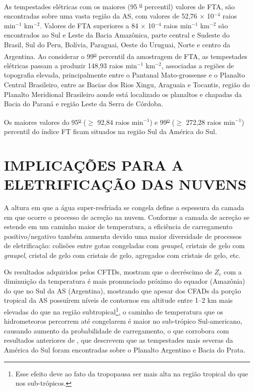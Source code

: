 As tempestades elétricas com os maiores (95 \textsuperscript{\underline{o}} percentil) valores de FTA, são encontradas sobre uma vasta região da AS, com valores de 52,76 $\times$ 10$^{-4}$ raios min$^{-1}$ km$^{-2}$. Valores de FTA superiores a 84 $\times$ 10$^{-4}$ raios min$^{-1}$ km$^{-2}$ são encontrados ao Sul e Leste da Bacia Amazônica, parte central e Sudeste do Brasil, Sul do Peru, Bolívia, Paraguai, Oeste do Uruguai, Norte e centro da Argentina. Ao considerar o 99\textsuperscript{\underline{o}} percentil da amostragem de FTA, as tempestades elétricas passam a produzir 148,93 raios min$^{-1}$ km$^{-2}$, associadas a regiões de topografia elevada, principalmente entre o Pantanal Mato-grossense e o Planalto Central Brasileiro, entre as Bacias dos Rios Xingu, Araguaia e Tocantis, região do Planalto Meridional Brasileiro aonde está localizado os planaltos e chapadas da Bacia do Paraná e região Leste da Serra de Córdoba.


Os maiores valores do 95\textsuperscript{\underline{o}} ($\geq$ 92,84 raios min$^{-1}$) e 99\textsuperscript{\underline{o}} ($\geq$ 272,28 raios min$^{-1}$) percentil do índice FT ficam situados na região Sul da América do Sul.




\section{IMPLICAÇÕES PARA A ELETRIFICAÇÃO DAS NUVENS}


A altura em que a água super-resfriada se congela define a espessura da camada em que ocorre o processo de  acreção na nuvem. Conforme a camada de acreção se estende em um caminho maior de temperatura, a eficiência de carregamento positivo/negativo também aumenta devido uma maior diversidade de processos de eletrificação: colisões entre gotas congeladas com \textit{graupel}, cristais de gelo com \textit{graupel}, cristal de gelo com cristais de gelo, agregados com cristais de gelo,  etc. 

Os resultados adquiridos pelos CFTDs, mostram que o decréscimo de $Z_c$ com a diminuição da temperatura é mais pronunciado próximo do equador (Amazônia) do que no Sul da AS (Argentina), mostrando que apesar dos CFADs da porção tropical da AS possuírem níveis de contornos em altitude entre 1--2 km mais elevadas do que na região subtropical\footnote{Esse efeito deve ao fato da tropopausa ser mais alta na região tropical do que nos sub-trópicos.}, o caminho de temperatura que os hidrometeoros percorrem até congelarem é maior no sub-trópico Sul-americano, causando aumento da probabilidade de carregamento, o que corrobora com resultados anteriores de  , que descrevem que as tempestades mais severas da América do Sul foram encontradas sobre o Planalto Argentino e Bacia do Prata.
 
